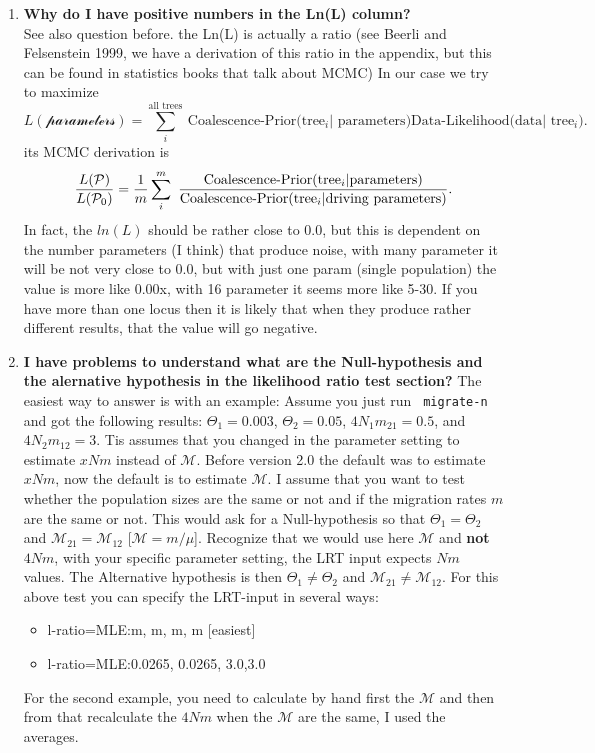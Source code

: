 \begin{enumerate}
\item {\bfseries  Why do I have positive numbers in the Ln(L) column? }\\
See also question before.
the Ln(L) is actually a ratio (see Beerli and Felsenstein 1999, we have a
derivation of this ratio in the appendix, but this can be found in 
statistics books that talk about MCMC)
In our case we try to maximize 
$$
L(\mathcal{\text{parameters}}) = \sum_i^{\text{all trees}}\ 
\text{Coalescence-Prior(tree$_i|$ parameters)} 
\text{Data-Likelihood(data$|$ tree$_i$)} .
$$
its MCMC derivation is 
$$
\frac{L(\P)}{L(\P_0)} = \frac{1}{m}\sum_i^m\ 
\frac{\text{Coalescence-Prior(tree$_i|$parameters)}}
{\text{Coalescence-Prior(tree$_i|$driving parameters)}} .
$$
In fact, the $ln(L)$ should be rather close to 0.0, 
but this is dependent on the number
parameters (I think) that produce noise, 
with many parameter it will be not very close
to 0.0, but with just one param (single population) the value
is more like 0.00x, with 16 parameter it seems more like 5-30. 
If you have more than one locus then it is likely that when 
they produce rather different results, that the value will go negative.

\item {\bfseries I have problems to understand what are the Null-hypothesis and the alernative hypothesis in the likelihood ratio test section?}
The easiest way to answer is with an example:
Assume you just run \texttt{ migrate-n} and got the following results:
$\Theta_1=0.003$, $\Theta_2=0.05$, $4N_1m_{21}=0.5$, and  
$4N_2m_{12}=3$. Tis assumes that you changed in the parameter setting to estimate $xNm$ instead of $\mathcal{M}$. Before version 2.0 the default was to estimate $xNm$, now the default is to estimate $\mathcal{M}$.   I assume that you want to test whether the population sizes are the 
same or not and if the migration rates $m$ are the same or not.
This would ask for a Null-hypothesis so that $\Theta_1=\Theta_2$ and
$\mathcal{M}_{21}=\mathcal{M}_{12}$ [$\mathcal{M}=m/\mu$]. 
Recognize that we would use here
$\mathcal{M}$ and {\bfseries not} $4Nm$, with your specific parameter setting, the LRT input expects $Nm$ values.
The Alternative hypothesis is then $\Theta_1 \ne \Theta_2$ and
$\mathcal{M}_{21} \ne \mathcal{M}_{12}$. For this above test you can specify the LRT-input in several ways:
\begin{itemize}
\item l-ratio=MLE:m, m, m, m [easiest]
\item l-ratio=MLE:0.0265, 0.0265, 3.0,3.0
\end{itemize}
For the second example, you need to calculate by hand first
the $\mathcal{M}$ and then from that recalculate the $4Nm$ when
the $\mathcal{M}$ are the same, I used the averages.


\end{enumerate}
